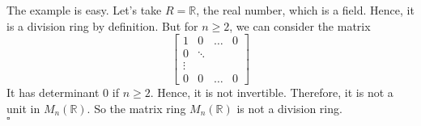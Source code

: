 \documentclass[12pt]{amsart}
\newcommand{\R}{\mathbb{R}}
\begin{document}
The example is easy. Let's take $R=\R$, the real number, which is a field. Hence, it is a division ring by definition. But for $n\geq 2$, we can consider the matrix
\[\begin{bmatrix}
    1&0&\dots &0\\
    0&\ddots\\
    \vdots\\
    0&0&\dots&0
\end{bmatrix}\]   
It has determinant 0 if $n\geq 2$. Hence, it is not invertible. Therefore, it is not a unit in $M_n(\R)$. So the matrix ring $M_n(\R)$ is not a division ring.
\\\phantom{qed}\hfill$\square$\\
\end{document}

